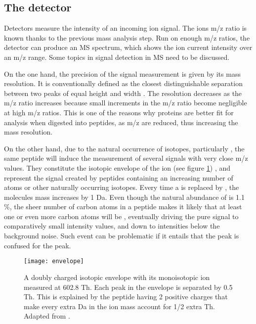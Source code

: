 \subsection{The detector}
\label{subsec:the_detector}

Detectors measure the intensity of an incoming ion signal. The ion\textquotesingle s \ac{m/z} ratio is known thanks to the previous mass analysis step. Run on enough \ac{m/z} ratios, the detector can produce an \ac{MS} spectrum, which shows the ion current intensity over an \ac{m/z} range. Some topics in signal detection in \ac{MS} need to be discussed.

On the one hand, the precision of the signal measurement is given by its mass resolution. It is conventionally defined as the closest distinguishable separation between two peaks of equal height and width \cite{Marshall2013}. The resolution decreases as the \ac{m/z} ratio increases because small increments in the \ac{m/z} ratio become negligible at high \ac{m/z} ratios. This is one of the reasons why proteins are better fit for analysis when digested into peptides, as \ac{m/z} are reduced, thus increasing the mass resolution.

On the other hand, due to the natural occurrence of isotopes, particularly , the same peptide will induce the measurement of several signals with very close \ac{m/z} values. They constitute the isotopic envelope of the ion (see figure \ref{fig:envelope}) \cite{Mirzaei2016}, and represent the signal created by peptides containing an increasing number of  atoms or other naturally occurring isotopes. Every time a  is replaced by , the molecule\textquotesingle s mass increases by 1 Da. Even though the natural abundance of  is 1.1 \%, the sheer number of carbon atoms in a peptide makes it likely that at least one or even more carbon atoms will be , eventually driving the pure  signal to comparatively small intensity values, and down to intensities below the background noise. Such event can be problematic if it entails that the  peak is confused for the  peak.

\begin{figure}[!h]
\texttt{[image: envelope]}
\caption[Isotopic envelope]{A doubly charged isotopic envelope with its monoisotopic ion measured at 602.8 Th. Each peak in the envelope is separated by 0.5 Th. This is explained by the peptide having 2 positive charges that make every extra Da in the ion mass account for 1/2 extra Th. Adapted from \cite{Mirzaei2016}.}
\label{fig:envelope}
\end{figure}


